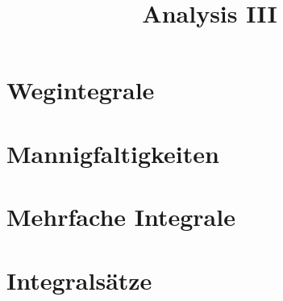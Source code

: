 \documentclass[12pt]{report}
\title{Analysis III}
\theoremstyle{definition}\newtheorem*{definition}{Definition}
\theoremstyle{definition}\newtheorem*{remark}{Bemerkung}
\begin{document}
\maketitle
\tableofcontents

\chapter{Wegintegrale}


\chapter{Mannigfaltigkeiten}


\chapter{Mehrfache Integrale}


\chapter{Integrals\"atze}

\end{document}
